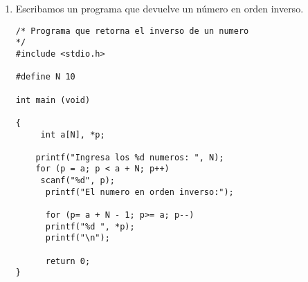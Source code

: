 \documentclass[twoside,10.5pt]{article}%
\begin{document}
\begin{enumerate}
\begin{verbatim}
int main()
{
   char text[100], subcadena[100];
   int posicion;
 
   printf("Ingrese algun texto\n");
   fgets(text,sizeof(text),stdin);
 
   printf("Ingrese la subcadena a ingresar\n");
   fgets(subcadena, sizeof(subcadena), stdin);
 
   printf("Ingrese la posicion donde quiera poner la subcadena\n");
   scanf("%d", &posicion);
 
   insert_subcadena(text, subcadena, posicion);
 
   printf("%s\n",text);
 
   return 0;
}
 
void insert_subcadena(char *a, char *b, int posicion)
{
   char *f, *e;
   int longitud;
 
   longitud = strlen(a);
 
   f = subcadena(a, 1, posicion - 1 );      
   e = subcadena(a, posicion, longitud-posicion+1);
 
   strcpy(a, "");
   strcat(a, f);
   free(f);
   strcat(a, b);
   strcat(a, e);
   free(e);
}
 
char *subcadena(char *cadena, int posicion, int longitud) 
{
   char *pointer;
   int c;
 
   pointer = malloc(longitud+1);
 
   if( pointer == NULL )
       exit(EXIT_FAILURE);
 
   for( c = 0 ; c < longitud ; c++ ) 
      *(pointer+c) = *((cadena+posicion-1)+c);       
 
   *(pointer+c) = '\0';
 
   return pointer;
}
\end{verbatim}
\item Escribamos un programa que devuelve un n\'umero en orden inverso.

\begin{verbatim}
/* Programa que retorna el inverso de un numero
*/
#include <stdio.h>

#define N 10

int main (void)

{
     int a[N], *p;
     
    printf("Ingresa los %d numeros: ", N);
    for (p = a; p < a + N; p++)
     scanf("%d", p);
      printf("El numero en orden inverso:");

      for (p= a + N - 1; p>= a; p--)
      printf("%d ", *p);
      printf("\n");
      
      return 0;
}
\end{verbatim}




\end{enumerate}
\end{document}
